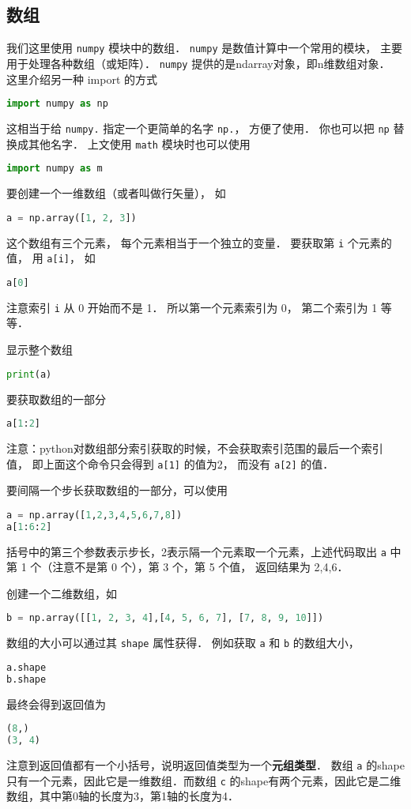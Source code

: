 

\subsection{数组}
我们这里使用 \verb|numpy| 模块中的数组． \verb|numpy| 是数值计算中一个常用的模块， 主要用于处理各种数组（或矩阵）． \verb|numpy| 提供的是ndarray对象，即n维数组对象． 这里介绍另一种 import 的方式
\begin{lstlisting}[language=python]
import numpy as np
\end{lstlisting}
这相当于给 \verb|numpy.| 指定一个更简单的名字 \verb|np.|， 方便了使用． 你也可以把 \verb|np| 替换成其他名字． 上文使用 \verb|math| 模块时也可以使用
\begin{lstlisting}[language=python]
import numpy as m
\end{lstlisting}

要创建一个一维数组（或者叫做行矢量）， 如
\begin{lstlisting}[language=python]
a = np.array([1, 2, 3])
\end{lstlisting}
这个数组有三个元素， 每个元素相当于一个独立的变量． 要获取第 \verb|i| 个元素的值， 用 \verb|a[i]|， 如
\begin{lstlisting}[language=python]
a[0]
\end{lstlisting}
注意索引 \verb|i| 从 0 开始而不是 1． 所以第一个元素索引为 0， 第二个索引为 1 等等．

显示整个数组
\begin{lstlisting}[language=python]
print(a)
\end{lstlisting}
要获取数组的一部分
\begin{lstlisting}[language=python]
a[1:2]
\end{lstlisting}
注意：python对数组部分索引获取的时候，不会获取索引范围的最后一个索引值， 即上面这个命令只会得到 \verb|a[1]| 的值为2， 而没有 \verb|a[2]| 的值．

要间隔一个步长获取数组的一部分，可以使用
\begin{lstlisting}[language=python]
a = np.array([1,2,3,4,5,6,7,8])
a[1:6:2]
\end{lstlisting}
括号中的第三个参数表示步长，2表示隔一个元素取一个元素，上述代码取出 \verb|a| 中第 1 个（注意不是第 0 个），第  3 个，第 5 个值， 返回结果为 2,4,6．

创建一个二维数组，如
\begin{lstlisting}[language=python]
b = np.array([[1, 2, 3, 4],[4, 5, 6, 7], [7, 8, 9, 10]])
\end{lstlisting}
数组的大小可以通过其 \verb|shape| 属性获得． 例如获取 \verb|a| 和 \verb|b| 的数组大小，
\begin{lstlisting}[language=python]
a.shape
b.shape
\end{lstlisting}
最终会得到返回值为
\begin{lstlisting}[language=python]
(8,)
(3, 4)
\end{lstlisting}
注意到返回值都有一个小括号，说明返回值类型为一个\textbf{元组类型}． 数组 \verb|a| 的shape只有一个元素，因此它是一维数组．而数组 \verb|c| 的shape有两个元素，因此它是二维数组，其中第0轴的长度为3，第1轴的长度为4．


